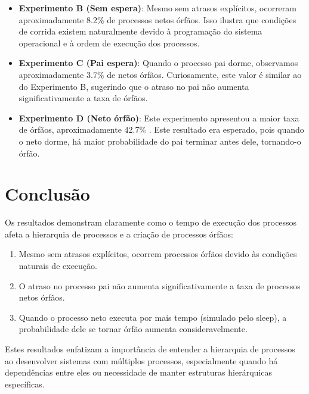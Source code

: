 \documentclass[a4paper,12pt]{article}
\begin{document}
\begin{itemize}
    \item \textbf{Experimento B (Sem espera)}: Mesmo sem atrasos explícitos, ocorreram aproximadamente 8.2\% de processos netos órfãos. Isso ilustra que condições de corrida existem naturalmente devido à programação do sistema operacional e à ordem de execução dos processos.

    \item \textbf{Experimento C (Pai espera)}: Quando o processo pai dorme, observamos aproximadamente 3.7\% de netos órfãos. Curiosamente, este valor é similar ao do Experimento B, sugerindo que o atraso no pai não aumenta significativamente a taxa de órfãos.

    \item \textbf{Experimento D (Neto órfão)}: Este experimento apresentou a maior taxa de órfãos, aproximadamente 42.7\% . Este resultado era esperado, pois quando o neto dorme, há maior probabilidade do pai terminar antes dele, tornando-o órfão.
\end{itemize}

\section{Conclusão}

Os resultados demonstram claramente como o tempo de execução dos processos afeta a hierarquia de processos e a criação de processos órfãos:

\begin{enumerate}
    \item Mesmo sem atrasos explícitos, ocorrem processos órfãos devido às condições naturais de execução.
    \item O atraso no processo pai não aumenta significativamente a taxa de processos netos órfãos.
    \item Quando o processo neto executa por mais tempo (simulado pelo sleep), a probabilidade dele se tornar órfão aumenta consideravelmente.
\end{enumerate}

Estes resultados enfatizam a importância de entender a hierarquia de processos ao desenvolver sistemas com múltiplos processos, especialmente quando há dependências entre eles ou necessidade de manter estruturas hierárquicas específicas.
\end{document}
